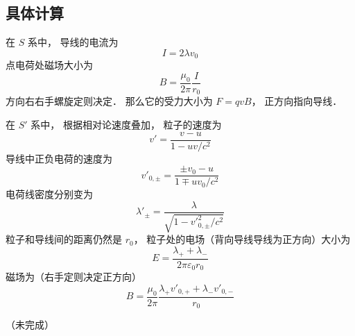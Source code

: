 \subsection{具体计算}
在 $S$ 系中， 导线的电流为
\begin{equation}
I = 2 \lambda v_0
\end{equation}
点电荷处磁场大小为
\begin{equation}
B = \frac{\mu_0}{2\pi} \frac{I}{r_0}
\end{equation}
方向右右手螺旋定则决定． 那么它的受力大小为 $F = q v B$， 正方向指向导线．

在 $S'$ 系中， 根据相对论速度叠加， 粒子的速度为
\begin{equation}
v' = \frac{v - u}{1 - uv/c^2}
\end{equation}
导线中正负电荷的速度为
\begin{equation}
v'_{0, \pm} = \frac{\pm v_0-u}{1 \mp uv_0/c^2}
\end{equation}
电荷线密度分别变为
\begin{equation}
\lambda'_\pm = \frac{\lambda}{\sqrt{1 - v'^2_{0,\pm}/c^2}}
\end{equation}
粒子和导线间的距离仍然是 $r_0$， 粒子处的电场（背向导线导线为正方向）大小为
\begin{equation}
E = \frac{\lambda_+ + \lambda_-}{2 \pi \varepsilon_{0} r_0}
\end{equation}
磁场为（右手定则决定正方向）
\begin{equation}
B = \frac{\mu_0}{2\pi} \frac{\lambda_+ v'_{0,+} + \lambda_- v'_{0,-}}{r_0}
\end{equation}


（未完成）

